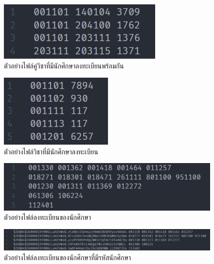 \begin{figure}
    \begin{center}
      \includegraphics[]{images/conflicts1.png}
    \end{center}
    \caption[ตัวอย่างไฟล์คู่วิชาที่มีนักศึกษาลงทะเบียนพร้อมกัน]{ตัวอย่างไฟล์คู่วิชาที่มีนักศึกษาลงทะเบียนพร้อมกัน}
    \label{fig:conflicts}     
\end{figure}
\begin{figure}
    \begin{center}
      \includegraphics[]{images/courses1.png}
    \end{center}
    \caption[ตัวอย่างไฟล์วิชาที่มีนักศึกษาลงทะเบียน]{ตัวอย่างไฟล์วิชาที่มีนักศึกษาลงทะเบียน}
    \label{fig:courses}     
\end{figure}
\begin{figure}
    \begin{center}
      \includegraphics[]{images/regist1.png}
    \end{center}
    \caption[ตัวอย่างไฟล์ลงทะเบียนของนักศึกษา]{ตัวอย่างไฟล์ลงทะเบียนของนักศึกษา}
    \label{fig:regist}     
\end{figure}
\begin{figure}
    \begin{center}
      \includegraphics[width=\linewidth]{images/regist_hashed.png}
    \end{center}
    \caption[ตัวอย่างไฟล์ลงทะเบียนของนักศึกษาที่มีรหัสนักศึกษา]{ตัวอย่างไฟล์ลงทะเบียนของนักศึกษาที่มีรหัสนักศึกษา}
    \label{fig:regist_hashed}     
\end{figure}

